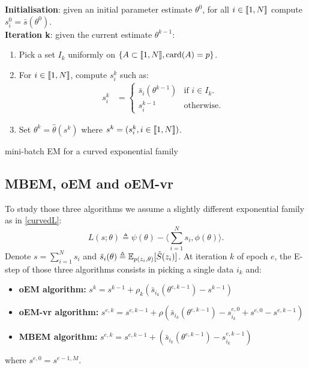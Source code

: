 \documentclass[11pt]{article}
\theoremstyle{plain}
\begin{document}
\begin{algorithm}[H]
\textbf{Initialisation}: given an initial parameter estimate $\theta^0$, for all $i \in \llbracket1,N\rrbracket$ compute $s^0_i = \bar{s}(\theta^0)$.\\
\textbf{Iteration k}: given the current estimate $\theta^{k-1}$:
\begin{enumerate}
\item Pick a set $I_k$ uniformly on $\{A \subset \llbracket1,N\rrbracket, \operatorname{card}(A)=p\}$.
\item For $i \in \llbracket1,N\rrbracket$, compute $s^k_{i}$ such as:
\begin{align}
 s^k_i &=
  \begin{cases}
   \bar{s}_i(\theta^{k-1})    & \text{if } i \in I_k.\\
   s^{k-1}_i                               & \text{otherwise}.
  \end{cases}
\end{align}

\item Set $\theta^{k} = \hat{\theta}(s^k)$ where $s^k = (s^k_i, i \in \llbracket1,N\rrbracket)$.

\end{enumerate}
\caption{mini-batch EM for a curved exponential family}
\label{alg:mbem-expo}
\end{algorithm}

\subsection{MBEM, oEM and oEM-vr}
To study those three algorithms we assume a slightly different exponential family as in \eqref{curvedL}:
\begin{equation}\label{curvedL}
L(s;\theta) \triangleq \psi(\theta) - \langle \sum_{i=1}^N{s_i}, \phi(\theta)\rangle.
\end{equation}
Denote $s = \sum_{i=1}^N{s_i}$ and $\bar{s}_i(\theta) \triangleq \operatorname*{\mathbb{E}}_{p(z_i, \theta)}[\tilde{S}(z_i)]$. At iteration $k$ of epoch $e$, the E-step of those three algorithms consists in picking a single data $i_k$ and:
\begin{itemize}
\item \textbf{oEM algorithm:}  $s^{k} = s^{k-1} + \rho_k ( \bar{s}_{i_k}(\theta^{e,k-1})  - s^{k-1} )$
\item \textbf{oEM-vr algorithm: }  $s^{e,k} = s^{e,k-1} + \rho ( \bar{s}_{i_k}(\theta^{e,k-1}) - s_{i_k}^{e,0}+ s^{e,0} - s^{e,k-1} )$
\item \textbf{MBEM algorithm: }  $s^{e,k} = s^{e,k-1} +  ( \bar{s}_{i_k}(\theta^{e,k-1})  - s_{i_k}^{e,k-1} )$
\end{itemize}
where $ s^{e,0}  = s^{e-1,M}$.
\end{document}
